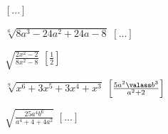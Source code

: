 \begin{esercizio}[\Ast]
\begin{multicols}{2}
\begin{enumeratea}
  \hfill $\left[...\right]$
 \item $\sqrt[6]{8a^3-24a^2+24a-8}$
  \hfill $\left[...\right]$
 \item $\sqrt{\frac{2x^2-2}{8x^2-8}}$
  \hfill $\left[\frac 1 2\right]$
 \item $\sqrt[9]{x^6+3x^5+3x^4+x^3}$
  \hfill $\left[\frac{5a^2\valass b^3}{a^2+2}\right]$
 \item $\sqrt{\frac{25a^4b^6}{a^4+4+4a^2}}$
  \hfill $\left[...\right]$
 \end{enumeratea}
 \end{multicols}
\end{esercizio}



